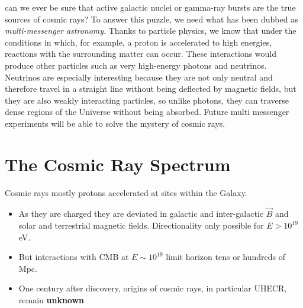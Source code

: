 \documentclass[
  letterpaper,
  DIV=11,
  numbers=noendperiod]{scrreprt}
\providecommand{\tightlist}{%
  \setlength{\itemsep}{0pt}\setlength{\parskip}{0pt}}\usepackage{longtable,booktabs,array}
\begin{document}
can we ever be sure that active galactic nuclei or gamma-ray bursts are
the true sources of cosmic rays? To answer this puzzle, we need what has
been dubbed as \emph{multi-messenger astronomy}. Thanks to particle
physics, we know that under the conditions in which, for example, a
proton is accelerated to high energies, reactions with the surrounding
matter can occur. These interactions would produce other particles such
as very high-energy photons and neutrinos. Neutrinos are especially
interesting because they are not only neutral and therefore travel in a
straight line without being deflected by magnetic fields, but they are
also weakly interacting particles, so unlike photons, they can traverse
dense regions of the Universe without being absorbed. Future multi
messenger experiments will be able to solve the mystery of cosmic rays.

\section{The Cosmic Ray Spectrum}\label{the-cosmic-ray-spectrum}

Cosmic rays mostly protons accelerated at sites within the Galaxy.

\begin{itemize}
\tightlist
\item
  As they are charged they are deviated in galactic and inter-galactic
  \(\vec{B}\) and solar and terrestrial magnetic fields. Directionality
  only possible for \(E \gt 10^{19}\) eV.
\item
  But interactions with CMB at \(E \sim 10^{19}\) limit horizon tens or
  hundreds of Mpc.
\item
  One century after discovery, origins of cosmic rays, in particular
  UHECR, remain \textbf{unknown}
\end{itemize}
\end{document}
